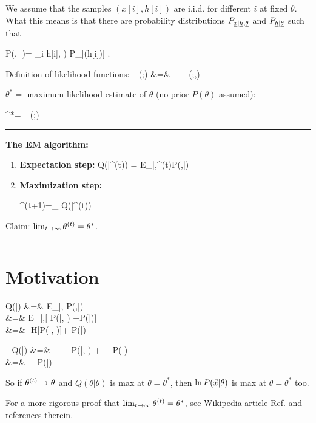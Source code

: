 We assume that the samples $(x[i],h[i])$
are i.i.d. for different $i$ at fixed 
$\theta$.
What this means is that 
there are
probability distributions
$P_{{\underline{x}}|{\underline{h}},\underline{\theta}}$
and $P_{{\underline{h}}|\underline{\theta}}$
such that

\beq
P(\vecx, \vech|\theta)=
\prod_i \left[P_{\rvx|\rvh,\ul{\theta}}
(x[i]\cond h[i], \theta)
P_{\rvh|\ul{\theta}}(h[i]\cond \theta)\right]
\;.
\eeq

Definition of likelihood functions:
\beqa
{}
_{\call(\theta;\vecx)}
&=&
\sum_{\vech}
_{\call(\theta;\vecx,\vech)}
\eeqa


$\theta^*=$ maximum likelihood
estimate of $\theta$ (no prior $P(\theta)$
assumed):

\beq
\theta^*=
\argmax_\theta\call(\theta;\vecx)
\eeq

\hrule\noindent
{\bf The EM algorithm:}
\begin{enumerate}
\item{\bf Expectation step:} 
\beq
Q(\theta|\theta^{(t)})
=
E_{\vech|\vecx,\theta^{(t)}}\ln P(\vecx,\vech|\theta)
\eeq

\item{\bf Maximization step:}

\beq
\theta^{(t+1)}=\argmax_\theta
Q(\theta|\theta^{(t)})
\eeq
\end{enumerate}
Claim: $\lim_{t\rightarrow \infty}
\theta^{(t)}=\theta^*$.

\;
\hrule
\section*{Motivation}

\beqa
Q(\theta|\theta)
&=&
E_{\vech|\vecx,\theta}
\ln P(\vecx,\vech|\theta)
\\
&=&
E_{\vech|\vecx,\theta}[
\ln P(\vech|\vecx, \theta) 
+\ln P(\vecx|\theta)]
\\
&=&
-H[P(\ul{\vech}|\vecx, \theta)]+
\ln P(\vecx|\theta)
\eeqa

\beqa
\partial_\theta Q(\theta|\theta)
&=&
-\sum_{\vech}\partial_\theta
P(\ul{\vech}|\vecx, \theta)
+
\partial_\theta
\ln P(\vecx|\theta)
\\
&=&
\partial_\theta
\ln P(\vecx|\theta)
\eeqa

So if $\theta^{(t)}\rightarrow \theta$
and $Q(\theta|\theta)$ is max at $\theta=\theta^*$,
then $\ln P({\vec{x}}|\theta)$
is max at $\theta=\theta^*$ too.

For a  more rigorous proof
that $\lim_{t\rightarrow \infty}\theta^{(t)}
=\theta^*$,
see Wikipedia article Ref.\cite{wiki-em}
and references therein.

